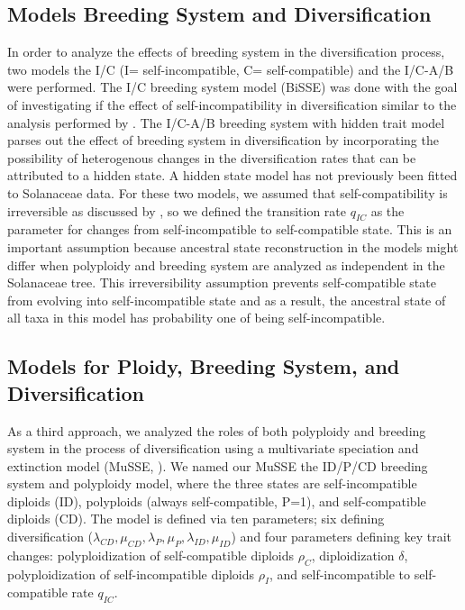 \subsection{Models Breeding System and Diversification}

In order to analyze the effects of breeding system in the diversification process, two models the I/C (I= self-incompatible, C= self-compatible) and the I/C-A/B were performed. The I/C breeding system model (BiSSE) was done with the goal of investigating if the effect of self-incompatibility in diversification similar to the analysis performed by \citet{goldberg_2012}. The I/C-A/B  breeding system with hidden trait model parses out the effect of breeding system in diversification by incorporating the possibility of heterogenous changes in the diversification rates that can be attributed to a hidden state. A hidden state model has not previously been fitted to Solanaceae data. For these two models, we assumed that self-compatibility is irreversible as discussed by \citet{igic_2013}, so we defined the transition rate $q_{IC}$ as the parameter for changes from self-incompatible to self-compatible state. This is an important assumption because ancestral state reconstruction in the models might differ when polyploidy and breeding system are analyzed as independent  in the Solanaceae tree. This irreversibility assumption prevents self-compatible state from evolving into self-incompatible state and as a result, the ancestral state of all taxa in this model has probability one of being self-incompatible.   %

\subsection{Models for Ploidy, Breeding System, and Diversification}

As a third approach, we analyzed the roles of both polyploidy and breeding system in the process of diversification using a multivariate speciation and extinction model (MuSSE, \citet{fitzjohn_2012}).  We named our MuSSE the ID/P/CD breeding system and polyploidy model, where the three states are self-incompatible diploids (ID), polyploids (always self-compatible, P=1), and self-compatible diploids (CD). The model is defined via ten parameters; six defining diversification ($\lambda_{CD}, \mu_{CD},\lambda_{P},\mu_{P}, \lambda_{ID},\mu_{ID}$) and  four parameters defining key trait changes: polyploidization of self-compatible diploids $\rho_{C}$, diploidization $\delta$, polyploidization of self-incompatible diploids $\rho_{I}$, and self-incompatible to self-compatible rate $q_{IC}$.

